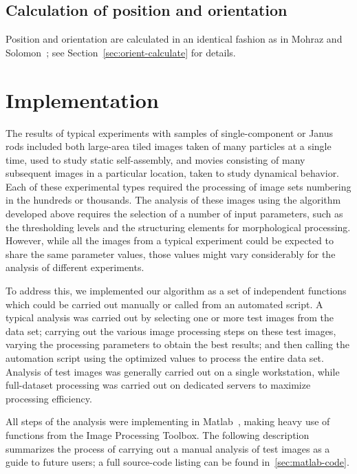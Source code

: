 \subsection{Calculation of position and orientation}

Position and orientation are calculated in an identical fashion as in Mohraz and Solomon~\cite{mohraz-rods}; see
Section~\ref{sec:orient-calculate} for details.

\section{Implementation}
\label{sec:matlab-implementation}

The results of typical experiments with samples of single-component or Janus rods included both 
large-area tiled images taken of many particles at a single time,
used to study static self-assembly, and movies consisting of many subsequent images in a 
particular location, taken to study dynamical behavior.  Each of these experimental types required the processing
of image sets numbering in the hundreds or thousands.  The analysis of these images using the algorithm developed
above requires the selection of a number of input parameters, such as the thresholding levels and the 
structuring elements for morphological processing.  However, while all the images from a typical
experiment could be expected to share the same parameter values, those values might vary considerably for the 
analysis of different
experiments.

To address this, we implemented our algorithm as a set of independent functions which could be carried out manually 
or called from an automated script. A typical analysis was carried out by selecting one or more 
test images from the data set; carrying out the various image processing steps on these test images, varying
the processing parameters to obtain the best results; and then calling the automation script using the 
optimized values to process the entire data set.  Analysis of test images was generally carried out on a single
workstation, while full-dataset processing was carried out on dedicated servers to maximize processing efficiency.

All steps of the analysis were implementing in Matlab~\cite{matlab}, making heavy use of functions from the
Image Processing Toolbox.  The following description summarizes the process of carrying out a manual analysis of
test images as a guide to future users; a full source-code listing can be found in~\ref{sec:matlab-code}.

